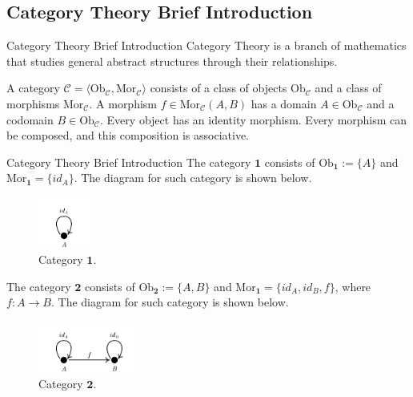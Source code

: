 \documentclass[aspectratio=169,xcolor=dvipsnames,9pt]{beamer}
\begin{document}
\subsection[Category Theory Brief Introduction]{Category Theory Brief Introduction}
\begin{frame}[fragile]{Category Theory Brief Introduction}
	Category Theory is a branch of mathematics that
	studies general abstract structures through their relationships.

	\begin{definition}[Category]
		A category $\mathcal C = \langle \text{Ob}_{\mathcal C}, \text{Mor}_{\mathcal C} \rangle$ consists
		of a class of objects $\text{Ob}_\mathcal C$ and a class of morphisms
		$\text{Mor}_\mathcal C$. A morphism $f \in \text{Mor}_\mathcal C(A,B)$ has a domain $A \in \text{Ob}_\mathcal C$
		and a codomain $B \in \text{Ob}_\mathcal C$. Every object has an identity morphism.
		Every morphism can be composed, and this composition is associative.
	\end{definition}
\end{frame}

\begin{frame}[fragile]{Category Theory Brief Introduction}
	The category $\bm 1$ consists of $\text{Ob}_{\bm 1} := \{A\}$ and $\text{Mor}_{\bm 1} = \{id_A\}$.
	The diagram for such category is shown below.
	\begin{figure}[H]
		\begin{center}
			\includegraphics[width=0.15\textwidth]{./figures/1Cat}
		\end{center}
		\caption{Category $\bm 1$.}
		\label{fig:1Cat}
	\end{figure}
	The category $\bm 2$ consists of $\text{Ob}_{\bm 2} := \{A, B\}$ and $\text{Mor}_{\bm 1} = \{id_A, id_B, f\}$,
	where $f:A \to B$.
	The diagram for such category is shown below.
	\begin{figure}[H]
		\begin{center}
			\includegraphics[width=0.30\textwidth]{./figures/2Cat}
		\end{center}
		\caption{Category $\bm 2$.}
		\label{fig:2Cat}
	\end{figure}
\end{frame}
\end{document}
